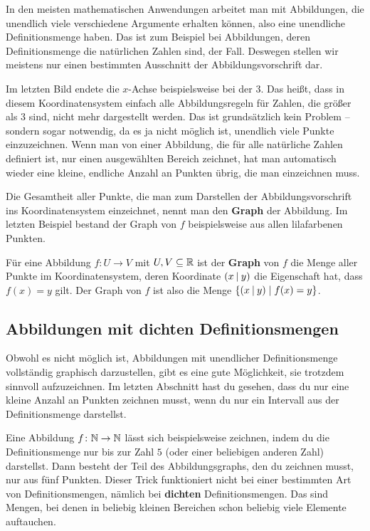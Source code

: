 \documentclass[../../main.tex]{subfiles}
\begin{document}
In den meisten mathematischen Anwendungen arbeitet man mit Abbildungen, die unendlich viele verschiedene Argumente erhalten können, also eine unendliche Definitionsmenge haben. Das ist zum Beispiel bei Abbildungen, deren Definitionsmenge die natürlichen Zahlen sind, der Fall. Deswegen stellen wir meistens nur einen bestimmten Ausschnitt der Abbildungsvorschrift dar.

Im letzten Bild endete die $x$-Achse beispielsweise bei der $3$. Das heißt, dass in diesem Koordinatensystem einfach alle Abbildungsregeln für Zahlen, die größer als $3$ sind, nicht mehr dargestellt werden. Das ist grundsätzlich kein Problem -- sondern sogar notwendig, da es ja nicht möglich ist, unendlich viele Punkte einzuzeichnen. Wenn man von einer Abbildung, die für alle natürliche Zahlen definiert ist, nur einen ausgewählten Bereich zeichnet, hat man automatisch wieder eine kleine, endliche Anzahl an Punkten übrig, die man einzeichnen muss.

Die Gesamtheit aller Punkte, die man zum Darstellen der Abbildungsvorschrift ins Koordinatensystem einzeichnet, nennt man den \textbf{Graph} der Abbildung. Im letzten Beispiel bestand der Graph von $f$ beispielsweise aus allen lilafarbenen Punkten.

\begin{definition}
        Für eine Abbildung $f\colon U\rightarrow V$ mit $U,V\subseteq \mathbb{R}$ ist der \textbf{Graph} von $f$ die Menge aller Punkte im Koordinatensystem, deren Koordinate $\left(x \:\middle|\: y\right)$ die Eigenschaft hat, dass $f(x)=y$ gilt. Der Graph von $f$ ist also die Menge $\{\left(x \:\middle|\: y\right) \mid f(x)=y\}$.
\end{definition}

\subsection{Abbildungen mit dichten Definitionsmengen}
\label{sec:abbildungen_graphen_stetig}

Obwohl es nicht möglich ist, Abbildungen mit unendlicher Definitionsmenge vollständig graphisch darzustellen, gibt es eine gute Möglichkeit, sie trotzdem sinnvoll aufzuzeichnen. Im letzten Abschnitt hast du gesehen, dass du nur eine kleine Anzahl an Punkten zeichnen musst, wenn du nur ein Intervall aus der Definitionsmenge darstellst. 

Eine Abbildung $f\colon\mathbb{N}\rightarrow\mathbb{N}$ lässt sich beispielsweise zeichnen, indem du die Definitionsmenge nur bis zur Zahl $5$ (oder einer beliebigen anderen Zahl) darstellst. Dann besteht der Teil des Abbildungsgraphs, den du zeichnen musst, nur aus fünf Punkten. Dieser Trick funktioniert nicht bei einer bestimmten Art von Definitionsmengen, nämlich bei \textbf{dichten} Definitionsmengen. Das sind Mengen, bei denen in beliebig kleinen Bereichen schon beliebig viele Elemente auftauchen.
\end{document}

